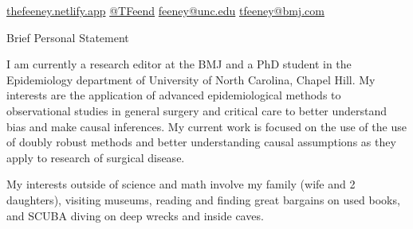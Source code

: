 \documentclass{resume} %
\begin{document}
%

\begin{center} 
 \href{https://thefeeney.netlify.app}{thefeeney.netlify.app}
 \hfill
 \href{https://twitter.com/TFeend}{@TFeend}
  \hfill
  \href{mailto:feeney@unc.edu}{feeney@unc.edu}
  \hfill
  \href{mailto:tfeeney@bmj.com}{tfeeney@bmj.com}
  \hfill
  \end{center}

\begin{rSection}{Brief Personal Statement}


{I am currently a research editor at the BMJ and a PhD student in the Epidemiology department of University of North Carolina, Chapel Hill. My interests are the application of advanced epidemiological methods to observational studies in general surgery and critical care to better understand bias and make causal inferences. My current work is focused on the use of the use of doubly robust methods and better understanding causal assumptions as they apply to research of surgical disease.

My interests outside of science and math involve my family (wife and 2 daughters), visiting museums, reading and finding great bargains on used books, and SCUBA diving on deep wrecks and inside caves.}

\end{rSection}
\end{document}
